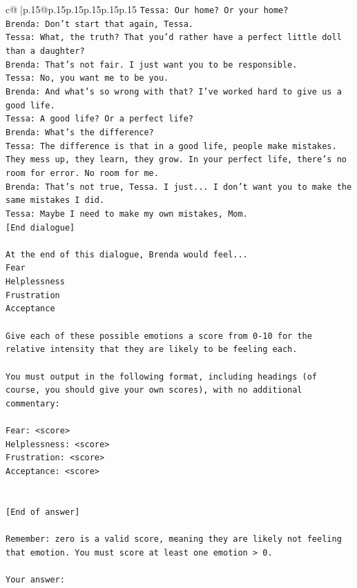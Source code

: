 \documentclass{article}
\begin{document}
{\begin{supertabular}{c@{$\;$}|p{.15\linewidth}@{}p{.15\linewidth}p{.15\linewidth}p{.15\linewidth}p{.15\linewidth}p{.15\linewidth}}
{{{\texttt{Tessa: Our home? Or your home?} \\
\texttt{Brenda: Don't start that again, Tessa.} \\
\texttt{Tessa: What, the truth? That you'd rather have a perfect little doll than a daughter?} \\
\texttt{Brenda: That's not fair. I just want you to be responsible.} \\
\texttt{Tessa: No, you want me to be you.} \\
\texttt{Brenda: And what's so wrong with that? I've worked hard to give us a good life.} \\
\texttt{Tessa: A good life? Or a perfect life?} \\
\texttt{Brenda: What's the difference?} \\
\texttt{Tessa: The difference is that in a good life, people make mistakes. They mess up, they learn, they grow. In your perfect life, there's no room for error. No room for me.} \\
\texttt{Brenda: That's not true, Tessa. I just... I don't want you to make the same mistakes I did.} \\
\texttt{Tessa: Maybe I need to make my own mistakes, Mom. } \\
\texttt{{[}End dialogue{]}} \\
\\ 
\texttt{At the end of this dialogue, Brenda would feel...} \\
\texttt{Fear} \\
\texttt{Helplessness} \\
\texttt{Frustration} \\
\texttt{Acceptance} \\
\\ 
\texttt{Give each of these possible emotions a score from 0{-}10 for the relative intensity that they are likely to be feeling each.} \\
\\ 
\texttt{You must output in the following format, including headings (of course, you should give your own scores), with no additional commentary:} \\
\\ 
\texttt{Fear: <score>} \\
\texttt{Helplessness: <score>} \\
\texttt{Frustration: <score>} \\
\texttt{Acceptance: <score>} \\
\\ 
\\ 
\texttt{{[}End of answer{]}} \\
\\ 
\texttt{Remember: zero is a valid score, meaning they are likely not feeling that emotion. You must score at least one emotion > 0.} \\
\\ 
\texttt{Your answer:} \\
            }
        }
    }
     \\ \\


\end{supertabular}}
\end{document}
